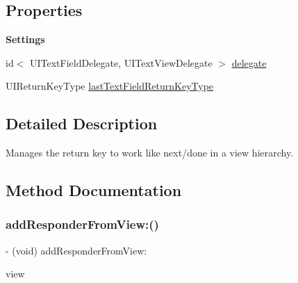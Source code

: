 \subsection*{Properties}
\begin{Indent}\textbf{ Settings}\par
{\em 

 

 }\begin{DoxyCompactItemize}
\item 
id$<$ U\+I\+Text\+Field\+Delegate, U\+I\+Text\+View\+Delegate $>$ \mbox{\hyperlink{interface_i_q_keyboard_return_key_handler_a1ff5b6e3110a7fef956354e3d74befe9}{delegate}}
\item 
U\+I\+Return\+Key\+Type \mbox{\hyperlink{interface_i_q_keyboard_return_key_handler_a310cdded0cf979ee31825f41f3b67ef2}{last\+Text\+Field\+Return\+Key\+Type}}
\end{DoxyCompactItemize}
\end{Indent}


\subsection{Detailed Description}
Manages the return key to work like next/done in a view hierarchy. 

\subsection{Method Documentation}
\mbox{\label{interface_i_q_keyboard_return_key_handler_ad6961c2e42c5964dc8a707ce844f26ad}} 
\subsubsection{\texorpdfstring{add\+Responder\+From\+View\+:()}{addResponderFromView:()}\hspace{0.1cm}{\footnotesize\ttfamily [1/3]}}
{\footnotesize\ttfamily -\/ (void) add\+Responder\+From\+View\+: \begin{DoxyParamCaption}\item[{(nonnull U\+I\+View $\ast$)}]{view }\end{DoxyParamCaption}}

